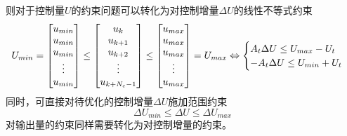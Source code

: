             则对于控制量$U$的约束问题可以转化为对控制增量$\Delta U$的线性不等式约束
            \begin{equation}
            U_{min} = \begin{bmatrix}
            u_{min} \\ u_{min} \\ u_{min} \\ \vdots \\ u_{min}
            \end{bmatrix} \leq \begin{bmatrix}
            u_k \\ u_{k+1} \\ u_{k+2} \\ \vdots \\ u_{k+N_c - 1}
            \end{bmatrix} \leq \begin{bmatrix}
            u_{max} \\ u_{max} \\ u_{max} \\ \vdots \\ u_{max}
            \end{bmatrix} = U_{max} \\
            \Leftrightarrow \begin{cases}
            A_t \Delta U \leq U_{max} - U_t \\
            -A_t \Delta U \leq U_{min} + U_t
            \end{cases}
            \end{equation}
            同时，可直接对待优化的控制增量$\Delta U$施加范围约束
            \begin{equation}
            \Delta U_{min} \leq \Delta U \leq \Delta U_{max}
            \end{equation}
            对输出量的约束同样需要转化为对控制增量的约束。

